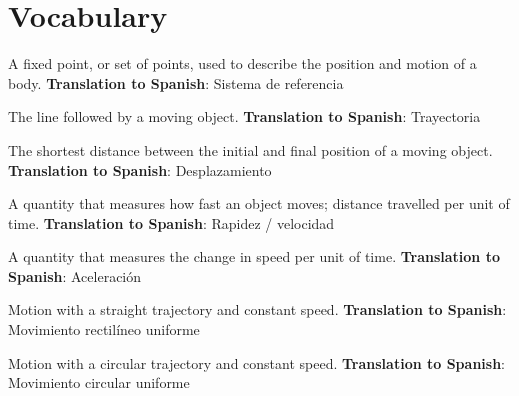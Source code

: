 \section{Vocabulary}

\begin{vocabulary}
    A fixed point, or set of points, used to describe the position and motion of a body. \newline
    \textbf{Translation to Spanish}: Sistema de referencia
\end{vocabulary}

\begin{vocabulary}[Trajectory]
    The line followed by a moving object. \newline
    \textbf{Translation to Spanish}: Trayectoria
\end{vocabulary}

\begin{vocabulary}[Displacement]
    The shortest distance between the initial and final position of a moving object. \newline
    \textbf{Translation to Spanish}: Desplazamiento
\end{vocabulary}

\begin{vocabulary}[Speed]
    A quantity that measures how fast an object moves; distance travelled per unit of time. \newline
    \textbf{Translation to Spanish}: Rapidez / velocidad
\end{vocabulary}

\begin{vocabulary}[Acceleration]
    A quantity that measures the change in speed per unit of time. \newline
    \textbf{Translation to Spanish}: Aceleración
\end{vocabulary}

\begin{vocabulary}
    Motion with a straight trajectory and constant speed. \newline
    \textbf{Translation to Spanish}: Movimiento rectilíneo uniforme
\end{vocabulary}

\begin{vocabulary}
    Motion with a circular trajectory and constant speed. \newline
    \textbf{Translation to Spanish}: Movimiento circular uniforme
\end{vocabulary}

